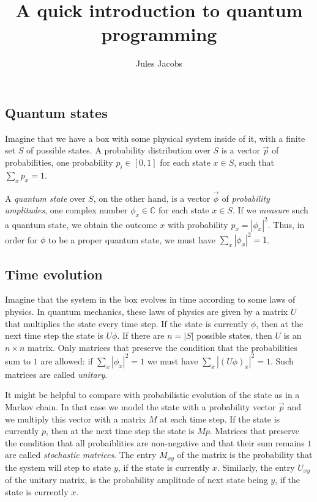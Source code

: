 \documentclass[a4paper, 11pt]{article}
\title{A quick introduction to quantum programming}
\author{Jules Jacobs}
\newcommand{\C}{\mathbb{C}}
\theoremstyle{definition}
\begin{document}
\maketitle


\subsection{Quantum states}

Imagine that we have a box with some physical system inside of it, with a finite set $S$ of possible states.
A probability distribution over $S$ is a vector $\vec{p}$ of probabilities, one probability $p_i \in [0,1]$ for each state $x \in S$, such that $\sum_x p_x = 1$.

A \emph{quantum state} over $S$, on the other hand, is a vector $\vec{\phi}$ of \emph{probability amplitudes}, one complex number $\phi_x \in \C$ for each state $x \in S$.
If we \emph{measure} such a quantum state, we obtain the outcome $x$ with probability $p_x = |\phi_x|^2$.
Thus, in order for $\phi$ to be a proper quantum state, we must have $\sum_x |\phi_x|^2 = 1$.

\subsection{Time evolution}

Imagine that the system in the box evolves in time according to some laws of physics.
In quantum mechanics, these laws of physics are given by a matrix $U$ that multiplies the state every time step.
If the state is currently $\phi$, then at the next time step the state is $U\phi$.
If there are $n = |S|$ possible states, then $U$ is an $n \times n$ matrix.
Only matrices that preserve the condition that the probabilities sum to $1$ are allowed: if $\sum_x |\phi_x|^2 = 1$ we must have $\sum_x |(U\phi)_x|^2 = 1$.
Such matrices are called \emph{unitary}.

It might be helpful to compare with probabilistic evolution of the state as in a Markov chain.
In that case we model the state with a probability vector $\vec{p}$ and we multiply this vector with a matrix $M$ at each time step.
If the state is currently $p$, then at the next time step the state is $Mp$.
Matrices that preserve the condition that all probaiblities are non-negative and that their sum remains $1$ are called \emph{stochastic matrices}.
The entry $M_{xy}$ of the matrix is the probability that the system will step to state $y$, if the state is currently $x$.
Similarly, the entry $U_{xy}$ of the unitary matrix, is the probability amplitude of next state being $y$, if the state is currently $x$.
\end{document}
